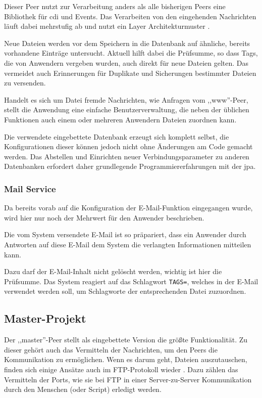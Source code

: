 \documentclass[oneside, ngerman, toc=bibliography,bibliography=totoc,listof=entryprefix, open=right,numbers=noenddot,fontsize=12pt]{scrbook}
\begin{document}
Dieser Peer nutzt zur Verarbeitung anders als alle bisherigen Peers eine Bibliothek für \acrshort{cdi} und Events. 
Das Verarbeiten von den eingehenden Nachrichten läuft dabei mehrstufig ab und nutzt ein Layer Architekturmuster \cite{buschmann1998pattern}.

Neue Dateien werden vor dem Speichern in die Datenbank auf ähnliche, bereits vorhandene Einträge untersucht.
Aktuell hilft dabei die Prüfsumme, so dass Tags, die von Anwendern vergeben wurden, auch direkt für neue Dateien gelten. Das vermeidet auch Erinnerungen für Duplikate und Sicherungen bestimmter Dateien zu versenden.

Handelt es sich um Datei fremde Nachrichten, wie Anfragen vom ,,www''-Peer, stellt die Anwendung eine einfache Benutzerverwaltung, die neben der üblichen Funktionen auch einem oder mehreren Anwendern Dateien zuordnen kann.

Die verwendete eingebettete Datenbank erzeugt sich komplett selbst, die Konfigurationen dieser können jedoch nicht ohne Änderungen am Code gemacht werden. Das Abstellen und Einrichten neuer Verbindungsparameter zu anderen Datenbanken erfordert daher grundlegende Programmiererfahrungen mit der \acrshort{jpa}.



\subsubsection{Mail Service}
Da bereits vorab auf die Konfiguration der E-Mail-Funktion eingegangen wurde, wird hier nur noch der Mehrwert für den Anwender beschrieben.

Die vom System versendete E-Mail ist so präpariert, dass ein Anwender durch Antworten auf diese E-Mail dem System die verlangten Informationen mitteilen kann.

Dazu darf der E-Mail-Inhalt nicht gelöscht werden, wichtig ist hier die Prüfsumme. Das System reagiert auf das Schlagwort \verb|TAGS=|, welches in der E-Mail verwendet werden soll, um Schlagworte der entsprechenden Datei zuzuordnen.



\subsection{Master-Projekt}

Der ,,master''-Peer stellt als eingebettete Version die größte  Funktionalität. Zu dieser gehört auch das Vermitteln der Nachrichten, um den Peers die Kommunikation zu ermöglichen. Wenn es darum geht, Dateien auszutauschen, finden sich einige Ansätze auch im FTP-Protokoll wieder \cite{rfc959}. 
Dazu zählen das Vermitteln der Ports, wie sie bei FTP in einer Server-zu-Server Kommunikation durch den Menschen (oder Script) erledigt werden.
\end{document}
